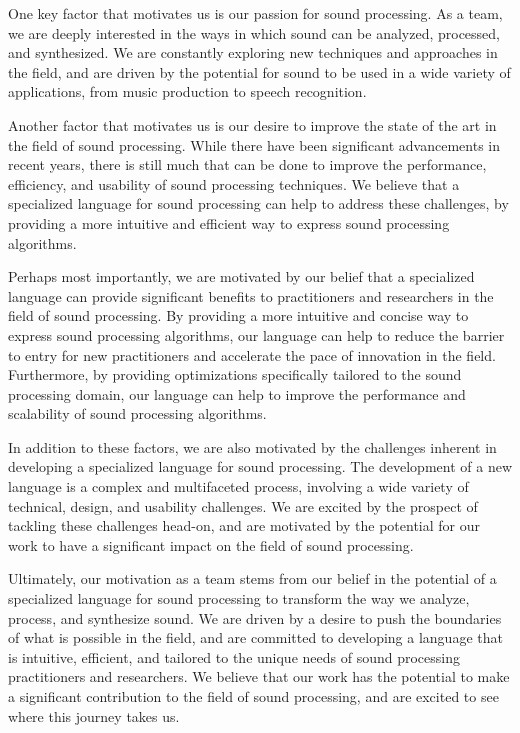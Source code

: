 One key factor that motivates us is our passion for sound processing. As a team, we are deeply interested in the ways in which sound can be analyzed, processed, and synthesized. We are constantly exploring new techniques and approaches in the field, and are driven by the potential for sound to be used in a wide variety of applications, from music production to speech recognition.

Another factor that motivates us is our desire to improve the state of the art in the field of sound processing. While there have been significant advancements in recent years, there is still much that can be done to improve the performance, efficiency, and usability of sound processing techniques. We believe that a specialized language for sound processing can help to address these challenges, by providing a more intuitive and efficient way to express sound processing algorithms.

Perhaps most importantly, we are motivated by our belief that a specialized language can provide significant benefits to practitioners and researchers in the field of sound processing. By providing a more intuitive and concise way to express sound processing algorithms, our language can help to reduce the barrier to entry for new practitioners and accelerate the pace of innovation in the field. Furthermore, by providing optimizations specifically tailored to the sound processing domain, our language can help to improve the performance and scalability of sound processing algorithms.

In addition to these factors, we are also motivated by the challenges inherent in developing a specialized language for sound processing. The development of a new language is a complex and multifaceted process, involving a wide variety of technical, design, and usability challenges. We are excited by the prospect of tackling these challenges head-on, and are motivated by the potential for our work to have a significant impact on the field of sound processing.

Ultimately, our motivation as a team stems from our belief in the potential of a specialized language for sound processing to transform the way we analyze, process, and synthesize sound. We are driven by a desire to push the boundaries of what is possible in the field, and are committed to developing a language that is intuitive, efficient, and tailored to the unique needs of sound processing practitioners and researchers. We believe that our work has the potential to make a significant contribution to the field of sound processing, and are excited to see where this journey takes us.
